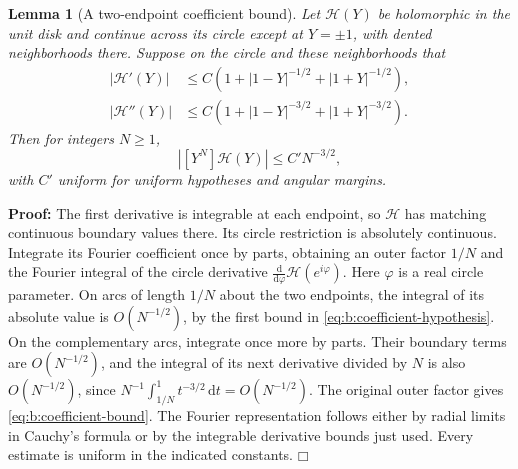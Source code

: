 \documentclass[a4paper,10pt]{article}
\numberwithin{equation}{section}
\newcommand{\dd}{\mathrm{d}}
\theoremstyle{paperplain}
\newtheorem{lmm}[thm]{Lemma}
\theoremstyle{paperremark}
\theoremstyle{paperplain}
\newenvironment{prf}{\noindent \textbf{Proof: }}{\hfill $\mdlgwhtsquare$\par\addvspace{0.5\baselineskip}}
\begin{document}
\begin{lmm}[A two-endpoint coefficient bound]\label{lmm:b:coefficient-bound}
Let $\mathcal H(Y)$ be holomorphic in the unit disk and continue
across its circle except at $Y=\pm1$, with dented neighborhoods
there. Suppose on the circle and these neighborhoods that
\begin{equation}\label{eq:b:coefficient-hypothesis}
 \begin{aligned}
 |\mathcal H'(Y)|&\leq C
       (1+|1-Y|^{-1/2}+|1+Y|^{-1/2}),\\
 |\mathcal H''(Y)|&\leq C
       (1+|1-Y|^{-3/2}+|1+Y|^{-3/2}).
 \end{aligned}
\end{equation}
Then for integers $N\geq1$,
\begin{equation}\label{eq:b:coefficient-bound}
 |[Y^N]\mathcal H(Y)|\leq C' N^{-3/2},
\end{equation}
with $C'$ uniform for uniform hypotheses and angular margins.
\end{lmm}
\begin{prf}
The first derivative is integrable at each endpoint, so
$\mathcal H$ has matching continuous boundary values there.
Its circle restriction is absolutely continuous. Integrate its
Fourier coefficient once by parts, obtaining an outer factor
$1/N$ and the Fourier integral of the circle derivative
$\frac{\dd}{\dd\varphi}\mathcal H(e^{i\varphi})$.
Here $\varphi$ is a real circle parameter. On arcs of length
$1/N$ about the two endpoints, the integral of its absolute value is
$O(N^{-1/2})$, by the first bound in
\eqref{eq:b:coefficient-hypothesis}. On the complementary arcs,
integrate once more by parts. Their boundary terms are
$O(N^{-1/2})$, and the integral of its next derivative divided by $N$ is also
$O(N^{-1/2})$, since
$N^{-1}\int_{1/N}^1t^{-3/2}\,\dd t=O(N^{-1/2})$.
The original outer factor gives \eqref{eq:b:coefficient-bound}.
The Fourier representation follows either by radial limits in
Cauchy's formula or by the integrable derivative bounds just used.
Every estimate is uniform in the indicated constants.
\end{prf}
\end{document}

